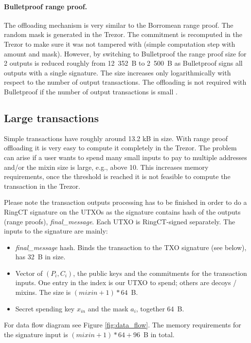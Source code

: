 \documentclass[]{article}
\begin{document}
\paragraph{Bulletproof range proof.} The offloading mechanism is very similar to the Borromean range proof. The random mask is generated in the Trezor. The commitment is recomputed in the Trezor to make sure it was not tampered with (simple computation step with amount and mask). 
However, by switching to Bulletproof the range proof size for 2 outputs is reduced roughly from 12~352~B to 2~500~B as Bulletproof signs all outputs with a single signature. The size increases only logarithmically with respect to the number of output transactions. The offloading is not required with Bulletproof if the number of output transactions is small \cite{Bnz2017BulletproofsSP}.

\subsection{Large transactions}
Simple transactions have roughly around 13.2 kB in size. With range proof offloading it is very easy to compute it completely in the Trezor. The problem can arise if a user wants to spend many small inputs to pay to multiple addresses and/or the mixin size is large, e.g., above 10. This increases memory requirements, once the threshold is reached it is not feasible to compute the transaction in the Trezor.

Please note the transaction outputs processing has to be finished in order to do a RingCT signature on the UTXOs as the signature contains hash of the outputs (range proofs), \emph{final\_message}. Each UTXO is RingCT-signed separately. The inputs to the signature are mainly:

\begin{itemize}
	\item \emph{final\_message} hash. Binds the transaction to the TXO signature (see below), has 32~B in size.
    \item Vector of $(P_i, C_i)$, the public keys and the commitments for the transaction inputs. One entry in the index is our UTXO to spend; others are decoys / mixins. The size is $(mixin+1) * 64$~B.
	\item Secret spending key $x_{in}$ and the mask $a_i$, together 64~B.
\end{itemize}
For data flow diagram see Figure \ref{fig:data_flow}.
The memory requirements for the signature input is $(mixin+1) * 64 + 96$~B in total.
\end{document}
